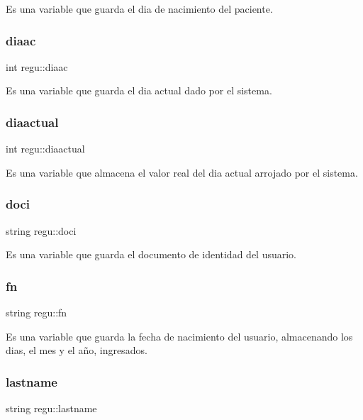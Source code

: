 Es una variable que guarda el dia de nacimiento del paciente. \mbox{\label{classregu_a744f894213a241d94323fea13158ea46}} 
\subsubsection{\texorpdfstring{diaac}{diaac}}
{\footnotesize\ttfamily int regu\+::diaac}

Es una variable que guarda el dia actual dado por el sistema. \mbox{\label{classregu_aced7d6b844bf254badde988ba1544d4f}} 
\subsubsection{\texorpdfstring{diaactual}{diaactual}}
{\footnotesize\ttfamily int regu\+::diaactual}

Es una variable que almacena el valor real del dia actual arrojado por el sistema. \mbox{\label{classregu_a3f72e08908b7acc437d924ee9619438b}} 
\subsubsection{\texorpdfstring{doci}{doci}}
{\footnotesize\ttfamily string regu\+::doci}

Es una variable que guarda el documento de identidad del usuario. \mbox{\label{classregu_ae71ceda1a90a9836dbf263eaa3bf9a84}} 
\subsubsection{\texorpdfstring{fn}{fn}}
{\footnotesize\ttfamily string regu\+::fn}

Es una variable que guarda la fecha de nacimiento del usuario, almacenando los dias, el mes y el año, ingresados. \mbox{\label{classregu_a676bef339cfb36f368ca41f2089268d1}} 
\subsubsection{\texorpdfstring{lastname}{lastname}}
{\footnotesize\ttfamily string regu\+::lastname}

